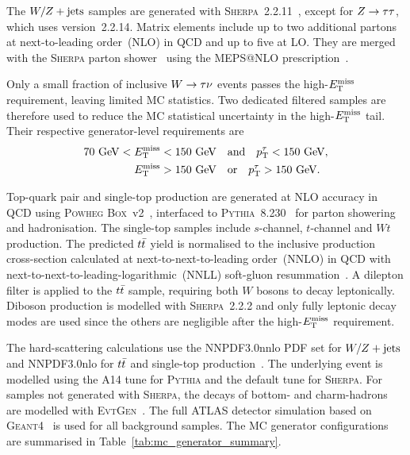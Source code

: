 The $W/Z+\mathrm{jets}$ samples are generated with \textsc{Sherpa}~2.2.11~\cite{Bothmann2019Sherpa22}, except for $Z\rightarrow\tau\tau$, which uses version~2.2.14.
Matrix elements include up to two additional partons at next-to-leading order~(NLO) in QCD and up to five at LO.
They are merged with the \textsc{Sherpa} parton shower~\cite{Schumann2008SherpaPS} using the MEPS@NLO prescription~\cite{Hoche2013MEPSNLO}.

Only a small fraction of inclusive $W\rightarrow\tau\nu$ events passes the high-$E_{\mathrm{T}}^{\mathrm{miss}}$ requirement, leaving limited MC statistics.
Two dedicated filtered samples are therefore used to reduce the MC statistical uncertainty in the high-$E_{\mathrm{T}}^{\mathrm{miss}}$ tail.
Their respective generator-level requirements are
\begin{align*}
    70~\mathrm{GeV} < E_{\mathrm{T}}^{\mathrm{miss}} < 150~\mathrm{GeV}
    &\quad\mathrm{and}\quad
    p_{\mathrm{T}}^{\tau} < 150~\mathrm{GeV}, \notag\\
    E_{\mathrm{T}}^{\mathrm{miss}} > 150~\mathrm{GeV}
    &\quad\mathrm{or}\quad
    p_{\mathrm{T}}^{\tau} > 150~\mathrm{GeV}.
\end{align*}

Top-quark pair and single-top production are generated at NLO accuracy in QCD using \textsc{Powheg Box}~v2~\cite{Frixione2007PowhegHF,Nason2004Powheg,Frixione2007Powheg,Alioli2010PowhegBox}, interfaced to \textsc{Pythia}~8.230~\cite{Sjostrand2015Pythia82} for parton showering and hadronisation.
The single-top samples include $s$-channel, $t$-channel and $Wt$ production. 
The predicted $t\bar{t}$ yield is normalised to the inclusive production cross-section calculated at next-to-next-to-leading order~(NNLO) in QCD with next-to-next-to-leading-logarithmic~(NNLL) soft-gluon resummation~\cite{CzakonMitov2014TopPP}.
A dilepton filter is applied to the $t\bar{t}$ sample, requiring both $W$ bosons to decay leptonically.
Diboson production is modelled with \textsc{Sherpa}~2.2.2 and only fully leptonic decay modes are used since the others are negligible after the high-$E_{\mathrm{T}}^{\mathrm{miss}}$ requirement.

The hard-scattering calculations use the NNPDF3.0nnlo PDF set for $W/Z+\mathrm{jets}$ and NNPDF3.0nlo for $t\bar{t}$ and single-top production~\cite{Ball2015NNPDF30}.
The underlying event is modelled using the A14 tune for \textsc{Pythia} and the default tune for \textsc{Sherpa}.
For samples not generated with \textsc{Sherpa}, the decays of bottom- and charm-hadrons are modelled with \textsc{EvtGen}~\cite{Lange2001EvtGen}.
The full ATLAS detector simulation based on \textsc{Geant4}~\cite{ATLAS2010Simulation,Agostinelli2003Geant4} is used for all background samples.
The MC generator configurations are summarised in Table~\ref{tab:mc_generator_summary}.

